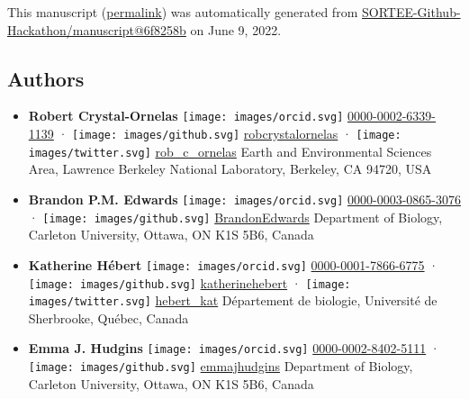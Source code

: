 This manuscript
(\href{https://SORTEE-Github-Hackathon.github.io/manuscript/v/6f8258b509eed4946bfc21d796eab05bbae47d1d/}{permalink})
was automatically generated
from \href{https://github.com/SORTEE-Github-Hackathon/manuscript/tree/6f8258b509eed4946bfc21d796eab05bbae47d1d}{SORTEE-Github-Hackathon/manuscript@6f8258b}
on June 9, 2022.

\hypertarget{authors}{%
\subsection{Authors}\label{authors}}

\begin{itemize}
\item
  \textbf{Robert Crystal-Ornelas}
  \texttt{[image: images/orcid.svg]}
  \href{https://orcid.org/0000-0002-6339-1139}{0000-0002-6339-1139}
  · \texttt{[image: images/github.svg]}
  \href{https://github.com/robcrystalornelas}{robcrystalornelas}
  · \texttt{[image: images/twitter.svg]}
  \href{https://twitter.com/rob_c_ornelas}{rob\_c\_ornelas}
  Earth and Environmental Sciences Area, Lawrence Berkeley National Laboratory, Berkeley, CA 94720, USA
\item
  \textbf{Brandon P.M. Edwards}
  \texttt{[image: images/orcid.svg]}
  \href{https://orcid.org/0000-0003-0865-3076}{0000-0003-0865-3076}
  · \texttt{[image: images/github.svg]}
  \href{https://github.com/BrandonEdwards}{BrandonEdwards}
  Department of Biology, Carleton University, Ottawa, ON K1S 5B6, Canada
\item
  \textbf{Katherine Hébert}
  \texttt{[image: images/orcid.svg]}
  \href{https://orcid.org/0000-0001-7866-6775}{0000-0001-7866-6775}
  · \texttt{[image: images/github.svg]}
  \href{https://github.com/katherinehebert}{katherinehebert}
  · \texttt{[image: images/twitter.svg]}
  \href{https://twitter.com/hebert_kat}{hebert\_kat}
  Département de biologie, Université de Sherbrooke, Québec, Canada
\item
  \textbf{Emma J. Hudgins}
  \texttt{[image: images/orcid.svg]}
  \href{https://orcid.org/0000-0002-8402-5111}{0000-0002-8402-5111}
  · \texttt{[image: images/github.svg]}
  \href{https://github.com/emmajhudgins}{emmajhudgins}
  Department of Biology, Carleton University, Ottawa, ON K1S 5B6, Canada

\end{itemize}

